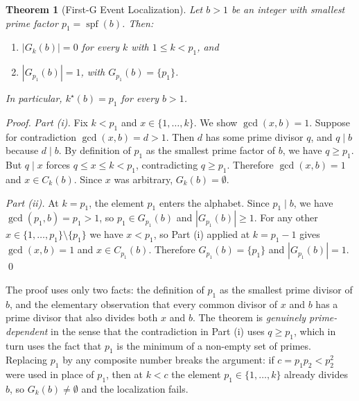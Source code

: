 \documentclass[11pt,reqno]{amsart}
\newtheorem{theorem}{Theorem}[section]
\theoremstyle{definition}
\DeclareMathOperator{\spf}{spf}
\begin{document}
\begin{theorem}[First-G Event Localization]
\label{thm:first-g}
Let $b > 1$ be an integer with smallest prime factor $p_1 = \spf(b)$.
Then:
\begin{enumerate}[label={\upshape(\roman*)}]
\item $|G_k(b)| = 0$ for every $k$ with $1 \le k < p_1$, and
\item $|G_{p_1}(b)| = 1$, with $G_{p_1}(b) = \{p_1\}$.
\end{enumerate}
In particular, $k^\star(b) = p_1$ for every $b > 1$.
\end{theorem}

\begin{proof}
\emph{Part (i).} Fix $k < p_1$ and $x \in \{1,\ldots,k\}$. We show
$\gcd(x,b) = 1$. Suppose for contradiction $\gcd(x,b) = d > 1$. Then $d$ has
some prime divisor $q$, and $q \mid b$ because $d \mid b$. By definition of
$p_1$ as the smallest prime factor of $b$, we have $q \ge p_1$. But $q \mid x$
forces $q \le x \le k < p_1$, contradicting $q \ge p_1$. Therefore
$\gcd(x,b) = 1$ and $x \in C_k(b)$. Since $x$ was arbitrary,
$G_k(b) = \emptyset$.

\emph{Part (ii).} At $k = p_1$, the element $p_1$ enters the alphabet. Since
$p_1 \mid b$, we have $\gcd(p_1, b) = p_1 > 1$, so $p_1 \in G_{p_1}(b)$ and
$|G_{p_1}(b)| \ge 1$. For any other $x \in \{1, \ldots, p_1\} \setminus
\{p_1\}$ we have $x < p_1$, so Part (i) applied at $k = p_1 - 1$ gives
$\gcd(x,b) = 1$ and $x \in C_{p_1}(b)$. Therefore
$G_{p_1}(b) = \{p_1\}$ and $|G_{p_1}(b)| = 1$.
\qed
\end{proof}

The proof uses only two facts: the definition of $p_1$ as the smallest prime
divisor of $b$, and the elementary observation that every common divisor of
$x$ and $b$ has a prime divisor that also divides both $x$ and $b$. The
theorem is \emph{genuinely prime-dependent} in the sense that the
contradiction in Part (i) uses $q \ge p_1$, which in turn uses the fact that
$p_1$ is the minimum of a non-empty set of primes. Replacing $p_1$ by any
composite number breaks the argument: if $c = p_1 p_2 < p_2^2$ were used in
place of $p_1$, then at $k < c$ the element $p_1 \in \{1,\ldots,k\}$ already
divides $b$, so $G_k(b) \ne \emptyset$ and the localization fails.
\end{document}
